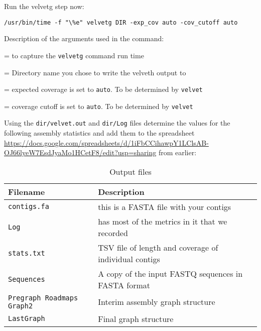 \begin{steps}
Run the velvetg step now:
\begin{lstlisting}
/usr/bin/time -f "\%e" velvetg DIR -exp_cov auto -cov_cutoff auto
\end{lstlisting}
\end{steps}

Description of the arguments used in the command:
\begin{description}[style=multiline,labelindent=0cm,align=right,leftmargin=\descriptionlabelspace,rightmargin=1.5cm,font=\ttfamily]
  \item[time] = to capture the \texttt{velvetg} command run time
  \item[DIR] = Directory name you chose to write the velveth output to
  \item[-exp_cov] = expected coverage is set to \texttt{auto}. To be determined by \texttt{velvet}
  \item[-cov_cutoff] = coverage cutoff is set to \texttt{auto}. To be determined by \texttt{velvet}
\end{description}



Using the \texttt{dir/velvet.out} and \texttt{dir/Log} files determine the values for the following assembly statistics and add them to the spreadsheet \url{https://docs.google.com/spreadsheets/d/1iFbCCihawpY1LClsAB-OJ66lyeW7EsdJyaMo1HCetF8/edit?usp=sharing} from earlier:
\begin{table}[H]
  \centering
  \caption{Output files}
    \begin{tabular}{ll}
    \toprule
    \textbf{Filename} & \textbf{Description} \\
    \midrule
    \texttt{contigs.fa} & this is a FASTA file with your contigs \\
    \texttt{Log} & has most of the metrics in it that we recorded \\
	\texttt{stats.txt} & TSV file of length and coverage of individual contigs \\ 
	\texttt{Sequences} & A copy of the input FASTQ sequences in FASTA format \\ 
	\texttt{Pregraph Roadmaps Graph2} & Interim assembly graph structure \\ 
	\texttt{LastGraph} & Final graph structure \\
    \bottomrule
    \end{tabular}
  \label{tab:velvet_out}
\end{table}

